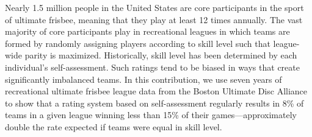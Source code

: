 Nearly 1.5 million people in the United States are core participants in the sport of ultimate frisbee, meaning that they play at least 12 times annually. The vast majority of core participants play in recreational leagues in which teams are formed by randomly assigning players according to skill level such that league-wide parity is maximized. Historically, skill level has been determined by each individual’s self-assessment. Such ratings tend to be biased in ways that create significantly imbalanced teams. In this contribution, we use seven years of recreational ultimate frisbee league data from the Boston Ultimate Disc Alliance to show that a rating system based on self-assessment regularly results in 8\% of teams in a given league winning less than 15\% of their games---approximately double the rate expected if teams were equal in skill level.